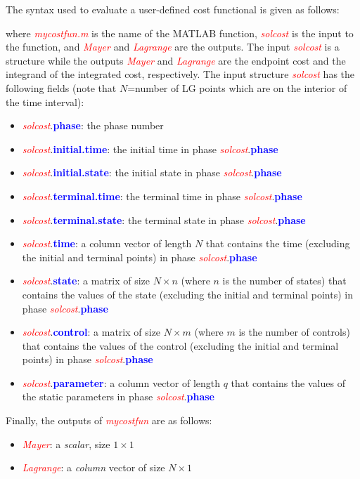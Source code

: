 \documentclass[10pt,final]{report}
\newcommand{\bfblue}[1]{\textcolor{blue}{\bf #1}}
\newcommand{\slred}[1]{\textcolor{red}{\sl #1}}
\begin{document}
The syntax used to evaluate a user-defined cost functional is given as follows:
\begin{center}
\end{center}
{\noindent}where \slred{mycostfun.m} is the name of the MATLAB function,
\slred{solcost} is the input to the function, and
\slred{Mayer} and \slred{Lagrange} are the outputs.  The input
\slred{solcost} is a structure while the outputs
\slred{Mayer} and \slred{Lagrange} are the endpoint cost and the
integrand of the integrated cost, respectively.  The input structure
\slred{solcost} has the following fields (note that $N$=number of LG points which are on the interior of the time interval):
\begin{itemize}
  \item \slred{solcost}.\bfblue{phase}:  the phase number
  \item \slred{solcost}.\bfblue{initial.time}:  the initial time in phase \slred{solcost}.\bfblue{phase}
  \item \slred{solcost}.\bfblue{initial.state}:  the initial state in phase \slred{solcost}.\bfblue{phase}
  \item \slred{solcost}.\bfblue{terminal.time}:  the terminal time in phase \slred{solcost}.\bfblue{phase}
  \item \slred{solcost}.\bfblue{terminal.state}:  the terminal state in phase \slred{solcost}.\bfblue{phase}
  \item \slred{solcost}.\bfblue{time}:  a column vector of length $N$ that
    contains the time (excluding the initial and terminal points) in
    phase \slred{solcost}.\bfblue{phase}
  \item \slred{solcost}.\bfblue{state}:  a matrix of size $N\times n$ (where $n$
    is the number of states) that contains the values of the state (excluding the initial and
    terminal points) in phase \slred{solcost}.\bfblue{phase}
  \item \slred{solcost}.\bfblue{control}:  a matrix of size $N\times m$ (where $m$
    is the number of controls) that contains the values of the control (excluding the initial and
    terminal points) in phase \slred{solcost}.\bfblue{phase}
  \item \slred{solcost}.\bfblue{parameter}:  a column vector of length $q$ that contains the values of the static parameters in phase \slred{solcost}.\bfblue{phase}
\end{itemize}
Finally, the outputs of \slred{mycostfun} are as follows:
\begin{itemize}
  \item \slred{Mayer}: a {\em scalar}, \ie size $1\times 1$
  \item \slred{Lagrange}: a {\em column} vector of size $N\times 1$
\end{itemize}
\end{document}
